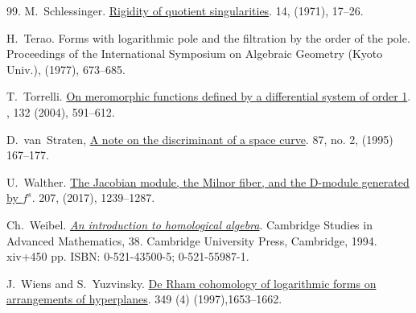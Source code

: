 \documentclass[12pt]{article}
\begin{document}
\begin{thebibliography}{99.}
 M.~Schlessinger.
\newblock \href{https://doi.org/10.1007/BF01418741}{Rigidity of quotient singularities}.
 14, (1971), 17--26.

 H.~Terao.
 \newblock Forms with logarithmic pole and the filtration by the order of the pole.
 \newblock Proceedings of the International Symposium on Algebraic Geometry (Kyoto Univ.), (1977), 673--685.

T.~Torrelli.
\newblock \href{https://doi.org/10.24033/bsmf.2475}{On meromorphic functions defined by a differential system of order 1}.
, 132 (2004), 591--612.

 D.~van~Straten,
 \newblock \href{https://doi.org/10.1007/BF02570469}{A note on the discriminant of a space curve}.
  87, no. 2, (1995) 167--177.

 U.~Walther.
 \newblock \href{https://doi.org/10.1007/s00222-016-0684-2}{The Jacobian module, the Milnor fiber, and the D-module generated by $f^s$}.
  207, (2017), 1239--1287.

 Ch.~Weibel.
\newblock \href{https://doi.org/10.1017/CBO9781139644136}{\it An introduction to homological algebra}.
\newblock Cambridge Studies in Advanced Mathematics, 38. Cambridge University Press, Cambridge, 1994. xiv+450 pp. ISBN: 0-521-43500-5; 0-521-55987-1.

 J.~Wiens and S.~Yuzvinsky.
\newblock  \href{https://doi.org/10.1090/S0002-9947-97-01894-1}{De Rham cohomology of logarithmic forms on arrangements of hyperplanes}.
 349 (4) (1997),1653--1662.
\end{thebibliography}
\end{document}
